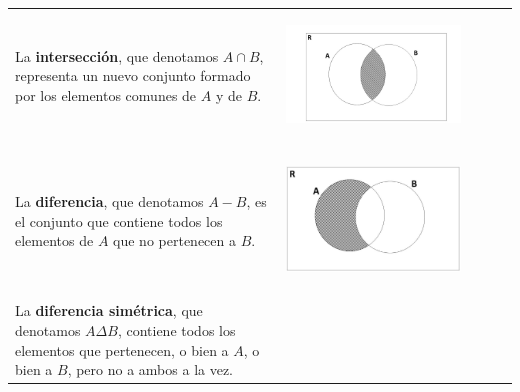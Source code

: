\documentclass[12pt]{article}
\theoremstyle{definition}
\begin{document}
\begin{enumerate}
\begin{table}[ H]
\begin{center}
\begin{tabular} { l l }
\begin{minipage}{10cm} La \textbf{intersección}, que denotamos $A \cap B$, representa un nuevo conjunto formado por los elementos comunes de $A$ y de $B$. \end{minipage}& \begin{minipage}{5cm} \begin{center} 
\includegraphics[width=0.8\textwidth]{tp1_fig10.jpg} 
\end{center}
\end{minipage}\\ \\  
\begin{minipage}{10cm} La \textbf{diferencia}, que denotamos $A -  B$, es el conjunto que contiene todos los elementos de $A$ que no pertenecen a $B$. \end{minipage} & \begin{minipage}{5cm} \begin{center} 
\includegraphics[width=0.8\textwidth]{tp1_fig7.jpg} 
\end{center}
\end{minipage}\\ \\ 
\begin{minipage}{10cm} La \textbf{diferencia simétrica}, que denotamos $A \Delta  B$, contiene todos los elementos que pertenecen, o bien a $A$, o bien a $B$, pero no a ambos a la vez. \end{minipage}& \begin{minipage}{5cm} \begin{center} 

\end{center}
\end{minipage}
\end{tabular}
\end{center}
\end{table}
\end{enumerate}
\end{document}
